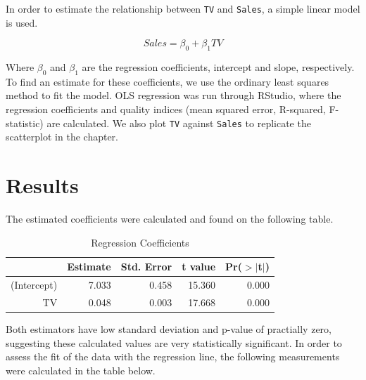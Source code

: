 \documentclass{article}
\begin{document}
In order to estimate the relationship between \texttt{TV} and \texttt{Sales}, a simple linear model is used.

\begin{equation}
Sales = \beta_0 + \beta_1 TV
\end{equation}

Where $\beta_0$ and $\beta_1$ are the regression coefficients, intercept and slope, respectively. To find an estimate for these coefficients, we use the ordinary least squares method to fit the model. OLS regression was run through RStudio, where the regression coefficients and quality indices (mean squared error, R-squared, F-statistic) are calculated. We also plot \texttt{TV} against \texttt{Sales} to replicate the scatterplot in the chapter.

\section{Results}

The estimated coefficients were calculated and found on the following table.

\begin{table}[ht]
\centering
\begin{tabular}{rrrrr}
  \hline
 & Estimate & Std. Error & t value & Pr($>$$|$t$|$) \\ 
  \hline
(Intercept) & 7.033 & 0.458 & 15.360 & 0.000 \\ 
  TV & 0.048 & 0.003 & 17.668 & 0.000 \\ 
   \hline
\end{tabular}
\caption{Regression Coefficients} 
\end{table}


Both estimators have low standard deviation and p-value of practially zero, suggesting these calculated values are very statistically significant. In order to assess the fit of the data with the regression line, the following measurements were calculated in the table below.
\end{document}
